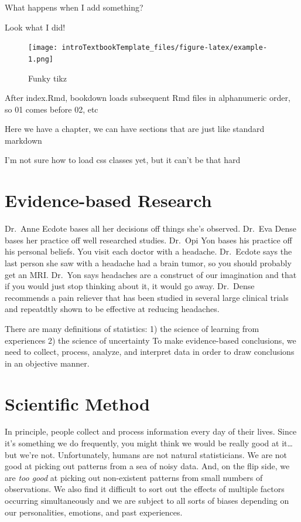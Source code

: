 \documentclass[
]{book}
\theoremstyle{definition}
\theoremstyle{definition}
\theoremstyle{definition}
\theoremstyle{remark}
\begin{document}
What happens when I add something?

Look what I did!

\begin{figure}
\centering
\texttt{[image: introTextbookTemplate\_files/figure-latex/example-1.png]}
\caption{\label{fig:example}Funky tikz}
\end{figure}

After index.Rmd, bookdown loads subsequent Rmd files in alphanumeric order, so 01 comes before 02, etc

Here we have a chapter, we can have sections that are just like standard markdown

I'm not sure how to load css classes yet, but it can't be that hard

\hypertarget{ch1_s1}{%
\section{Evidence-based Research}\label{ch1_s1}}

Dr.~Anne Ecdote bases all her decisions off things she's observed. Dr.~Eva Dense bases her practice off well researched studies. Dr.~Opi Yon bases his practice off his personal beliefs. You visit each doctor with a headache. Dr.~Ecdote says the last person she saw with a headache had a brain tumor, so you should probably get an MRI. Dr.~Yon says headaches are a construct of our imagination and that if you would just stop thinking about it, it would go away. Dr.~Dense recommends a pain reliever that has been studied in several large clinical trials and repeatdtly shown to be effective at reducing headaches.

There are many definitions of statistics:
1) the science of learning from experiences
2) the science of uncertainty
To make evidence-based conclusions, we need to collect, process, analyze, and interpret data in order to draw conclusions in an objective manner.

\hypertarget{ch1_s2}{%
\section{Scientific Method}\label{ch1_s2}}

In principle, people collect and process information every day of their lives. Since it's something we do frequently, you might think we would be really good at it\ldots but we're not. Unfortunately, humans are not natural statisticians. We are not good at picking out patterns from a sea of noisy data. And, on the flip side, we are \emph{too good} at picking out non-existent patterns from small numbers of observations. We also find it difficult to sort out the effects of multiple factors occurring simultaneously and we are subject to all sorts of biases depending on our personalities, emotions, and past experiences.
\end{document}
